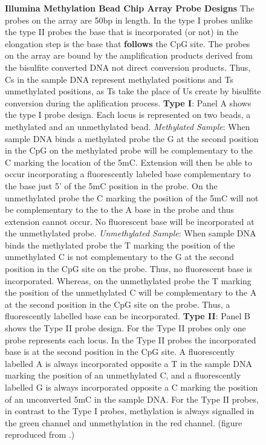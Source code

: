 \documentclass[
]{book}
\begin{document}
\begin{figure}
\caption{\textbf{Illumina Methylation Bead Chip Array Probe Designs}
The probes on the array are 50bp in length. In the type I probes unlike the type II probes the base that is incorporated (or not) in the elongation step is the base that \textbf{follows} the CpG site. The probes on the array are bound by the amplification products derived from the bisulfite converted DNA not direct conversion products. Thus, Cs in the sample DNA represent methylated positions and Ts unmethylated positions, as Ts take the place of Us create by bisulfite conversion during the aplification process.
\textbf{Type I}: Panel A shows the type I probe design. Each locus is represented on two beads, a methylated and an unmethylated bead. \emph{Methylated Sample}: When sample DNA binds a methylated probe the G at the second position in the CpG on the methylated probe will be complementary to the C marking the location of the 5mC. Extension will then be able to occur incorporating a fluorescently labeled base complementary to the base just 5' of the 5mC position in the probe. On the unmethylated probe the C marking the position of the 5mC will not be complementary to the to the A base in the probe and thus extension cannot occur. No fluorescent base will be incorporated at the unmethylated probe. \emph{Unmethylated Sample}: When sample DNA binds the methylated probe the T marking the position of the unmethylated C is not complementary to the G at the second position in the CpG site on the probe. Thus, no fluorescent base is incorporated. Whereas, on the unmethylated probe the T marking the position of the unmethylated C will be complementary to the A at the second position in the CpG site on the probe. Thus, a fluorescently labelled base can be incorporated. \textbf{Type II}: Panel B shows the Type II probe design. For the Type II probes only one probe represents each locus. In the Type II probes the incorporated base is at the second position in the CpG site. A fluorescently labelled A is always incorporated opposite a T in the sample DNA marking the position of an unmethylated C, and a fluorescently labelled G is always incorporated opposite a C marking the position of an unconverted 5mC in the sample DNA. For the Type II probes, in contrast to the Type I probes, methylation is always signalled in the green channel and unmethylation in the red channel. (figure reproduced from \citep{Bibikova2011}.)}\label{fig:Bibikova2011IlluminaMethylationBeadChip}
\end{figure}
\end{document}
